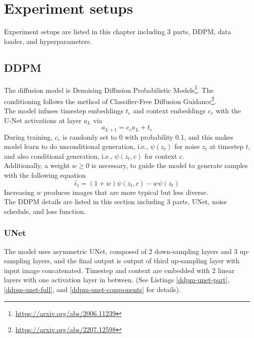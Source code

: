 \chapter{Experiment setups}\label{experiment}
\indent
    Experiment setups are listed in this chapter including 3 parts, 
    DDPM, data loader, and hyperparameters.

\section{DDPM}
\indent
    The diffusion model is Denoising Diffusion Probabilistic Models\footnote{\url{https://arxiv.org/abs/2006.11239}}.
    The conditioning follows the method of Classifier-Free Diffusion Guidance\footnote{\url{https://arxiv.org/abs/2207.12598}}. \\
    The model infuses timestep embeddings $t_e$ and context embeddings $c_e$ with the U-Net activations at layer $a_L$ via
    $$
    a_{L + 1} = c_ea_L + t_e
    $$
    During training, $c_e$ is randomly set to 0 with probability 0.1, and this makes model learn to do unconditional generation, i.e., 
    $\psi(z_t)$ for noise $z_t$ at timestep $t$, and also conditional generation, i.e., $\psi(z_t, c)$ for context $c$. \\
    Additionally, a weight $w \ge 0$ is necessary, to guide the model to generate samples with the following equation
    $$
    \hat{\epsilon}_t = (1 + w)\psi(z_t, c) - w\psi(z_t)
    $$
    Increasing $w$ produces images that are more typical but less diverse. \\
    The DDPM details are listed in this section including 3 parts, 
    UNet, noise schedule, and loss function.

\subsection{UNet}
\indent
    The model uses asymmetric UNet, composed of 2 down-sampling layers and 3 up-sampling layers, and 
    the final output is output of third up-sampling layer with input image concatenated. 
    Timestep and context are embedded with 2 linear layers with one  activation layer in between.
    (See Listings \ref{ddpm-unet-part}, \ref{ddpm-unet-full}, and \ref{ddpm-unet-components} for details).

